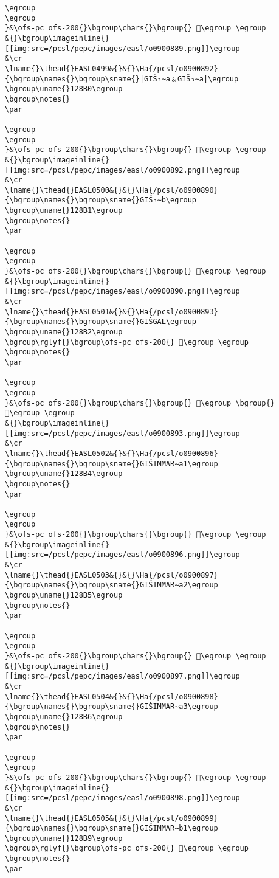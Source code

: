 \begin{verbatim}
\egroup
\egroup
}&\ofs-pc ofs-200{}\bgroup\chars{}\bgroup{} 𒢯\egroup \egroup
&{}\bgroup\imageinline{}[[img:src=/pcsl/pepc/images/easl/o0900889.png]]\egroup
&\cr
\lname{}\thead{}EASL0499&{}&{}\Ha{/pcsl/o0900892}{\bgroup\names{}\bgroup\sname{}|GIŠ₃∼a﹠GIŠ₃∼a|\egroup
\bgroup\uname{}128B0\egroup
\bgroup\notes{}
\par 

\egroup
\egroup
}&\ofs-pc ofs-200{}\bgroup\chars{}\bgroup{} 𒢰\egroup \egroup
&{}\bgroup\imageinline{}[[img:src=/pcsl/pepc/images/easl/o0900892.png]]\egroup
&\cr
\lname{}\thead{}EASL0500&{}&{}\Ha{/pcsl/o0900890}{\bgroup\names{}\bgroup\sname{}GIŠ₃∼b\egroup
\bgroup\uname{}128B1\egroup
\bgroup\notes{}
\par 

\egroup
\egroup
}&\ofs-pc ofs-200{}\bgroup\chars{}\bgroup{} 𒢱\egroup \egroup
&{}\bgroup\imageinline{}[[img:src=/pcsl/pepc/images/easl/o0900890.png]]\egroup
&\cr
\lname{}\thead{}EASL0501&{}&{}\Ha{/pcsl/o0900893}{\bgroup\names{}\bgroup\sname{}GIŠGAL\egroup
\bgroup\uname{}128B2\egroup
\bgroup\rglyf{}\bgroup\ofs-pc ofs-200{} 𒢲\egroup \egroup
\bgroup\notes{}
\par 

\egroup
\egroup
}&\ofs-pc ofs-200{}\bgroup\chars{}\bgroup{} 𒢳\egroup \bgroup{} 𒢲\egroup \egroup
&{}\bgroup\imageinline{}[[img:src=/pcsl/pepc/images/easl/o0900893.png]]\egroup
&\cr
\lname{}\thead{}EASL0502&{}&{}\Ha{/pcsl/o0900896}{\bgroup\names{}\bgroup\sname{}GIŠIMMAR∼a1\egroup
\bgroup\uname{}128B4\egroup
\bgroup\notes{}
\par 

\egroup
\egroup
}&\ofs-pc ofs-200{}\bgroup\chars{}\bgroup{} 𒢴\egroup \egroup
&{}\bgroup\imageinline{}[[img:src=/pcsl/pepc/images/easl/o0900896.png]]\egroup
&\cr
\lname{}\thead{}EASL0503&{}&{}\Ha{/pcsl/o0900897}{\bgroup\names{}\bgroup\sname{}GIŠIMMAR∼a2\egroup
\bgroup\uname{}128B5\egroup
\bgroup\notes{}
\par 

\egroup
\egroup
}&\ofs-pc ofs-200{}\bgroup\chars{}\bgroup{} 𒢵\egroup \egroup
&{}\bgroup\imageinline{}[[img:src=/pcsl/pepc/images/easl/o0900897.png]]\egroup
&\cr
\lname{}\thead{}EASL0504&{}&{}\Ha{/pcsl/o0900898}{\bgroup\names{}\bgroup\sname{}GIŠIMMAR∼a3\egroup
\bgroup\uname{}128B6\egroup
\bgroup\notes{}
\par 

\egroup
\egroup
}&\ofs-pc ofs-200{}\bgroup\chars{}\bgroup{} 𒢶\egroup \egroup
&{}\bgroup\imageinline{}[[img:src=/pcsl/pepc/images/easl/o0900898.png]]\egroup
&\cr
\lname{}\thead{}EASL0505&{}&{}\Ha{/pcsl/o0900899}{\bgroup\names{}\bgroup\sname{}GIŠIMMAR∼b1\egroup
\bgroup\uname{}128B9\egroup
\bgroup\rglyf{}\bgroup\ofs-pc ofs-200{} 𒢹\egroup \egroup
\bgroup\notes{}
\par 


\end{verbatim}
